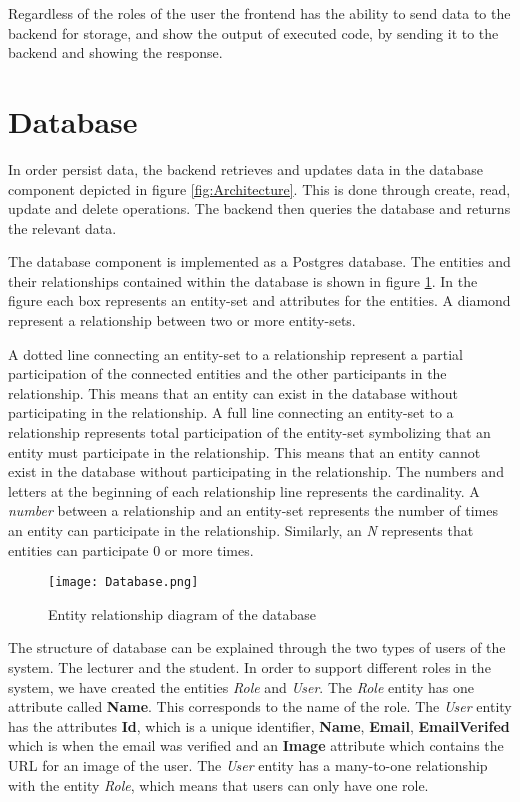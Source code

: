 Regardless of the roles of the user the frontend has the ability to send data to the backend for storage, and show the output of executed code, by sending it to the backend and showing the response.

\section{Database}
In order persist data, the backend retrieves and updates data in the database component depicted in figure \ref{fig:Architecture}. This is done through create, read, update and delete operations. 
The backend then queries the database and returns the relevant data. 

The database component is implemented as a Postgres database. The entities and their relationships contained within the database is shown in figure \ref{fig:Database}. In the figure each box represents an entity-set and attributes for the entities. A diamond represent a relationship between two or more entity-sets.

A dotted line connecting an entity-set to a relationship represent a partial participation of the connected entities and the other participants in the relationship. This means that an entity can exist in the database without participating in the relationship.
A full line connecting an entity-set to a relationship represents total participation of the entity-set symbolizing that an entity must participate in the relationship. 
This means that an entity cannot exist in the database without participating in the relationship.
The numbers and letters at the beginning of each relationship line represents the cardinality. A \textit{number} between a relationship and an entity-set represents the number of times an entity can participate in the relationship. Similarly, an \textit{N} represents that entities can participate $0$ or more times.

\begin{figure}[H]
	\texttt{[image: Database.png]}
	\centering
	\caption{Entity relationship diagram of the database}
	\label{fig:Database}
\end{figure}

The structure of database can be explained through the two types of users of the system. The lecturer and the student.
In order to support different roles in the system, we have created the entities \textit{Role} and \textit{User}. The \textit{Role} entity has one attribute called \textbf{Name}. This corresponds to the name of the role. The \textit{User} entity has the attributes \textbf{Id}, which is a unique identifier, \textbf{Name}, \textbf{Email}, \textbf{EmailVerifed} which is when the email was verified and an \textbf{Image} attribute which contains the URL for an image of the user. The \textit{User} entity has a many-to-one relationship with the entity \textit{Role}, which means that users can only have one role.

